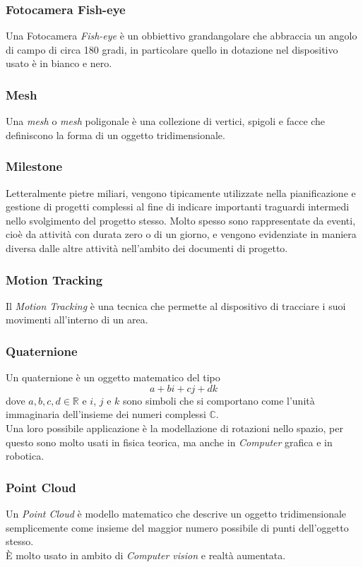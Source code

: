 \subsubsection{Fotocamera Fish-eye}
Una Fotocamera \emph{Fish-eye} è un obbiettivo grandangolare che abbraccia un angolo di campo di circa 180 gradi, in particolare quello in dotazione nel dispositivo usato è in bianco e nero.

\subsubsection{Mesh}
Una \emph{mesh} o \emph{mesh} poligonale è una collezione di vertici, spigoli e facce che definiscono la forma di un oggetto tridimensionale.

\subsubsection{Milestone}
Letteralmente pietre miliari, vengono tipicamente utilizzate nella pianificazione e gestione
di progetti complessi al fine di indicare importanti traguardi intermedi nello svolgimento del progetto
stesso. Molto spesso sono rappresentate da eventi, cioè da attività con durata zero o di un giorno,
e vengono evidenziate in maniera diversa dalle altre attività nell'ambito dei documenti di progetto.

\subsubsection{Motion Tracking}
Il \emph{Motion Tracking} è una tecnica che permette al dispositivo di tracciare i suoi movimenti all'interno di un area.

\subsubsection{Quaternione}
Un quaternione è un oggetto matematico del tipo
$$a+bi+cj+dk$$
dove $a,b,c,d\in \mathbb{R}$ e $i$, $j$ e $k$ sono simboli che si comportano come l'unità immaginaria dell'insieme dei numeri complessi $\mathbb{C}$.\\
Una loro possibile applicazione è la modellazione di rotazioni nello spazio, per questo sono molto usati in fisica teorica, ma anche in \emph{Computer} grafica e in robotica.

\subsubsection{Point Cloud}
Un \emph{Point Cloud} è modello matematico che descrive un oggetto tridimensionale semplicemente come insieme del maggior numero possibile di punti dell'oggetto stesso.\\
È molto usato in ambito di \emph{Computer vision} e realtà aumentata.

